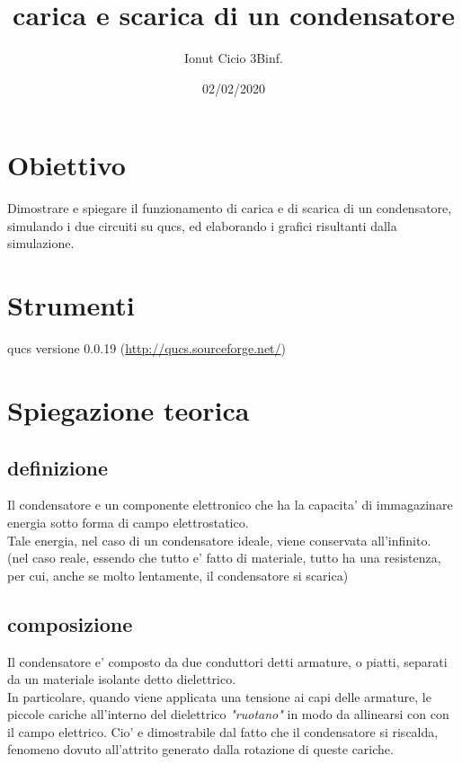 \documentclass[12pt]{article}
\begin{document}
\title{carica e scarica di un condensatore}
\author{Ionut Cicio 3Binf.}
\date{02/02/2020}

\maketitle

\section*{Obiettivo}
Dimostrare e spiegare il funzionamento di carica e di scarica di un condensatore,
simulando i due circuiti su qucs, ed elaborando i grafici risultanti dalla simulazione.

\section*{Strumenti}
qucs versione 0.0.19 (\url{http://qucs.sourceforge.net/})

\section*{Spiegazione teorica}

\subsection*{definizione}
Il condensatore e un componente elettronico che ha la capacita' di immagazinare energia sotto forma di campo elettrostatico. \\
Tale energia, nel caso di un condensatore ideale, viene conservata all'infinito.\\
(nel caso reale, essendo che tutto e' fatto di materiale, tutto ha una resistenza, per cui, anche se molto lentamente, il condensatore si scarica)

\subsection*{composizione}
Il condensatore e' composto da due conduttori detti armature, o piatti, separati da un materiale isolante detto dielettrico. \\
In particolare, quando viene applicata una tensione ai capi delle armature, le piccole cariche all'interno del dielettrico \textit{"ruotano"} in modo da allinearsi con con il campo elettrico.
Cio' e dimostrabile dal fatto che il condensatore si riscalda, fenomeno dovuto all'attrito generato dalla rotazione di queste cariche. \\
\end{document}
